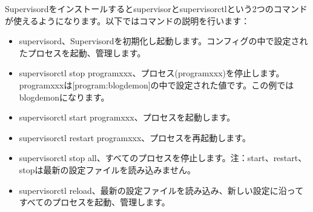 Supervisordをインストールするとsupervisorとsupervisorctlという2つのコマンドが使えるようになります。以下ではコマンドの説明を行います：

\begin{itemize}
  \item supervisord、Supervisordを初期化し起動します。コンフィグの中で設定されたプロセスを起動、管理します。
  \item supervisorctl stop programxxx、プロセス(programxxx)を停止します。programxxxは[program:blogdemon]の中で設定された値です。この例ではblogdemonになります。
  \item supervisorctl start programxxx、プロセスを起動します。
  \item supervisorctl restart programxxx、プロセスを再起動します。
  \item supervisorctl stop all、すべてのプロセスを停止します。注：start、restart、stopは最新の設定ファイルを読み込みません。
  \item supervisorctl reload、最新の設定ファイルを読み込み、新しい設定に沿ってすべてのプロセスを起動、管理します。
\end{itemize}
